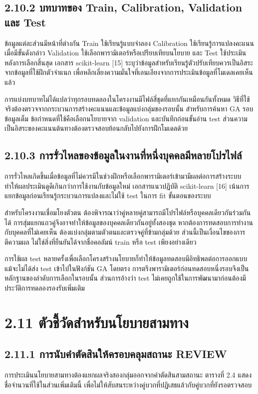 \documentclass[12pt,a4paper]{report}
\begin{document}
\subsection*{2.10.2 บทบาทของ Train, Calibration, Validation และ Test}
ข้อมูลแต่ละส่วนมีหน้าที่ต่างกัน Train ใช้เรียนรู้แบบจำลอง Calibration ใช้เรียนรู้การแปลงคะแนนเมื่อมีขั้นดังกล่าว Validation ใช้เลือกพารามิเตอร์หรือเปรียบเทียบนโยบาย และ Test ใช้ประเมินหลังการเลือกสิ้นสุด เอกสาร scikit-learn [15] ระบุว่าข้อมูลสำหรับเรียนรู้ตัวปรับเทียบควรเป็นอิสระจากข้อมูลที่ใช้ฝึกตัวจำแนก เพื่อหลีกเลี่ยงความมั่นใจที่เอนเอียงจากการประเมินข้อมูลที่โมเดลเคยเห็นแล้ว

การแบ่งบทบาทไม่ได้แปลว่าทุกรอบทดลองในโครงงานมีไฟล์สี่ชุดที่แยกกันเหมือนกันทั้งหมด วิธีที่ใช้จริงต้องตรวจจากกระบวนการสร้างคะแนนและข้อมูลแบ่งกลุ่มของรอบนั้น สำหรับการค้นหา GA รอบข้อมูลเต็ม ข้อกำหนดที่ใช้คือเลือกนโยบายจาก validation และบันทึกก่อนขั้นอ่าน test ส่วนความเป็นอิสระของคะแนนต้นทางต้องตรวจสอบย้อนกลับไปยังการฝึกโมเดลด้วย

\subsection*{2.10.3 การรั่วไหลของข้อมูลในงานที่หนึ่งบุคคลมีหลายโปรไฟล์}
การรั่วไหลเกิดขึ้นเมื่อข้อมูลที่ไม่ควรมีในช่วงฝึกหรือเลือกพารามิเตอร์เข้ามามีผลต่อการสร้างระบบ ทำให้ผลประเมินดูดีเกินกว่าการใช้งานกับข้อมูลใหม่ เอกสารแนวปฏิบัติ scikit-learn [16] เน้นการแยกข้อมูลก่อนเรียนรู้กระบวนการแปลงและไม่ใช้ test ในการ fit ขั้นตอนของระบบ

สำหรับโครงงานเชื่อมโยงตัวตน ต้องพิจารณาว่าคู่หลายคู่สามารถมีโปรไฟล์หรือบุคคลเดียวกันร่วมกันได้ การสุ่มแยกแถวคู่จึงอาจทำให้ข้อมูลของบุคคลเดียวกันอยู่ทั้งสองชุด หากต้องการทดสอบการทำงานกับบุคคลที่ไม่เคยเห็น ต้องแบ่งกลุ่มตามตัวตนและตรวจคู่ที่ข้ามกลุ่มด้วย ส่วนนี้เป็นเงื่อนไขของการตีความผล ไม่ใช่สิ่งที่ยืนยันได้จากชื่อคอลัมน์ train หรือ test เพียงอย่างเดียว

การใช้ผล test หลายครั้งเพื่อเลือกโครงสร้างนโยบายก็ทำให้ข้อมูลทดสอบมีอิทธิพลต่อการออกแบบ แม้จะไม่ได้ส่ง test เข้าไปในฟังก์ชัน GA โดยตรง การตรึงพารามิเตอร์ก่อนทดสอบหนึ่งรอบจึงเป็นหลักฐานของลำดับการเลือกในรอบนั้น ส่วนการอ้างว่า test ไม่เคยถูกใช้ในการพัฒนามาก่อนต้องมีประวัติการทดลองรองรับเพิ่มเติม

\section*{2.11 ตัวชี้วัดสำหรับนโยบายสามทาง}
\subsection*{2.11.1 การนับคำตัดสินให้ครอบคลุมสถานะ REVIEW}
การประเมินนโยบายสามทางต้องแยกผลจริงสองกลุ่มออกจากคำตัดสินสามสถานะ ตารางที่ 2.4 แสดงชื่อจำนวนที่ใช้ในส่วนเพิ่มเติมนี้ เพื่อไม่ให้สับสนระหว่างคู่บวกที่ปฏิเสธแล้วกับคู่บวกที่ยังรอตรวจสอบ
\end{document}
